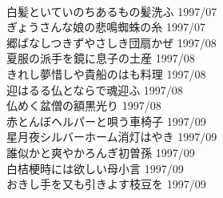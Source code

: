\begin{multicols}{2}
\\白髪といていのちあるもの髪洗ふ 1997/07
\\ぎょうさんな娘の悲鳴蜘蛛の糸 1997/07
\\郷ばなしつきずやさしき団扇かぜ 1997/08
\\夏服の派手を鏡に息子の土産 1997/08
\\きれし夢惜しや貴船のはも料理 1997/08
\\迎はるる仏とならで魂迎ふ 1997/08
\\仏めく盆僧の額黒光り 1997/08
\\赤とんぼヘルパーと唄う車椅子 1997/09
\\星月夜シルバーホーム消灯はやき 1997/09
\\誰似かと爽やかろんぎ初曽孫 1997/09
\\白桔梗時には欲しい母小言 1997/09
\\おきし手を又も引きよす枝豆を 1997/09
\end{multicols}
